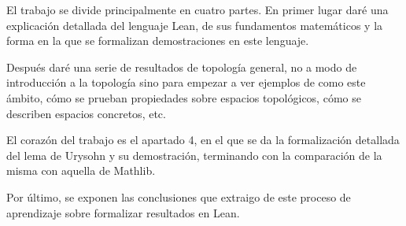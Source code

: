 El trabajo se divide principalmente en cuatro partes. En primer lugar daré una explicación detallada del lenguaje Lean, de sus fundamentos matemáticos y la forma en la que se formalizan demostraciones en este lenguaje.

Después daré una serie de resultados de topología general, no a modo de introducción a la topología sino para empezar a ver ejemplos de como este ámbito, cómo se prueban propiedades sobre espacios topológicos, cómo se describen espacios concretos, etc.

El corazón del trabajo es el apartado 4, en el que se da la formalización detallada del lema de Urysohn y su demostración, terminando con la comparación de la misma con aquella de Mathlib.

Por último, se exponen las conclusiones que extraigo de este proceso de aprendizaje sobre formalizar resultados en Lean.